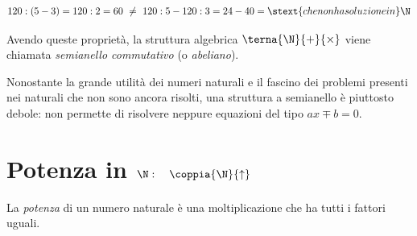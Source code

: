 \vspace{-1.5em}
\[120 : (5 - 3) = 120 : 2 = 60 ~\neq~ 
120 : 5 - 120 : 3 = 24 - 40 = \stext{che non ha soluzione in} \N\]


Avendo queste proprietà, la struttura algebrica \(\terna{\N}{+}{\times}\) 
viene chiamata \emph{semianello commutativo} (o \emph{abeliano}).

\begin{osservazione}{}{}
Nonostante la grande utilità dei numeri naturali e il fascino dei problemi 
presenti nei naturali che non sono ancora risolti, una struttura a 
semianello è piuttosto debole:
non permette di risolvere neppure equazioni del tipo \(ax \mp b = 0\).
\end{osservazione}


% 

\section{Potenza in $\N: \quad \coppia{\N}{\uparrow}$}
\label{sec:nat_potenza}

La \emph{potenza} di un numero naturale è una moltiplicazione che ha tutti 
i fattori uguali.


